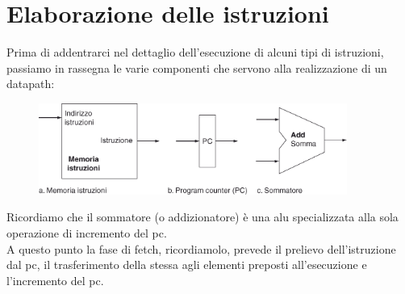 \documentclass[class=book, crop=false, oneside]{standalone}
\begin{document}
\section{Elaborazione delle istruzioni}
Prima di addentrarci nel dettaglio dell'esecuzione di alcuni tipi di istruzioni, passiamo in rassegna le varie componenti che servono alla realizzazione di un datapath:
\begin{figure}[H]
	\centering
	\includegraphics[width=0.9\textwidth,keepaspectratio]{datap_3}
\end{figure}
Ricordiamo che il sommatore (o addizionatore) è una \acrshort{alu} specializzata alla sola operazione di incremento del \acrshort{pc}.\\
A questo punto la fase di fetch, ricordiamolo, prevede il prelievo dell'istruzione dal \acrshort{pc}, il trasferimento della stessa agli elementi preposti all'esecuzione e l'incremento del \acrshort{pc}.
\end{document}
